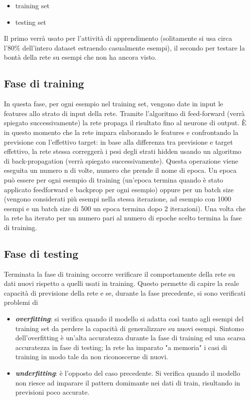 \documentclass[12pt]{report}
\begin{document}
\begin{itemize}
\item{training set}
\item{testing set}
\end{itemize}

Il primo verrà usato per l'attività di apprendimento (solitamente si usa circa l'80\% dell'intero dataset estraendo casualmente esempi), il secondo per testare la bontà della rete su esempi che non ha ancora visto.

\subsection{Fase di training}
In questa fase, per ogni esempio nel training set, vengono date in input le features allo strato di input della rete. Tramite l'algoritmo di feed-forward (verrà spiegato successivamente) la rete propaga il risultato fino al neurone di output. È in questo momento che la rete impara elaborando le features e confrontando la previsione con l’effettivo target: in base alla differenza tra previsione e target effettivo, la rete stessa correggerà i pesi degli strati hidden usando un algoritmo di back-propagation (verrà spiegato successivamente).
Questa operazione viene eseguita un numero n di volte, numero che prende il nome di epoca. Un epoca può essere per ogni esempio di training (un’epoca termina quando è stato applicato feedforward e backprop per ogni esempio) oppure per un batch size (vengono considerati più esempi nella stessa iterazione, ad esempio con 1000 esempi e un batch size di 500 un epoca termina dopo 2 iterazioni).
Una volta che la rete ha iterato per un numero pari al numero di epoche scelto termina la fase di training.

\subsection{Fase di testing}
Terminata la fase di training occorre verificare il comportamente della rete su dati nuovi rispetto a quelli usati in training. Questo permette di capire la reale capacità di previsione della rete e se, durante la fase precedente, si sono verificati problemi di 
\begin{itemize}
\item{\textbf{\textit{overfitting}}}: si verifica quando il modello si adatta così tanto agli esempi del training set da perdere la capacità di generalizzare su nuovi esempi. Sintomo dell'overfitting è un'alta accuratezza durante la fase di training ed una scarsa accuratezza in fase di testing; la rete ha imparato "a memoria" i casi di training in modo tale da non riconoscerne di nuovi.
\item{\textbf{\textit{underfitting}}}: è l'opposto del caso precedente. Si verifica quando il modello non riesce ad imparare il pattern domimante nei dati di train, risultando in previsioni poco accurate.
\end{itemize}
\end{document}
